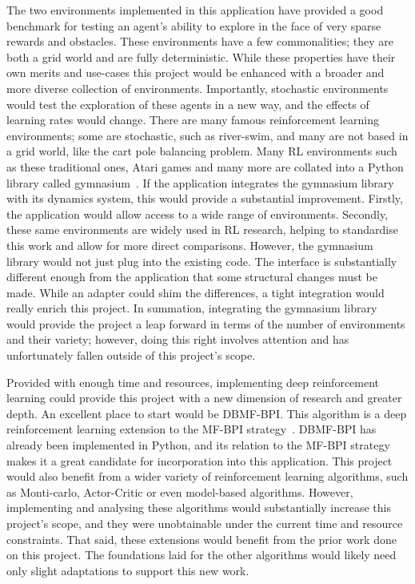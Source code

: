 \documentclass[]{final_report}
\begin{document}
The two environments implemented in this application have provided a good benchmark for testing an agent's ability to explore in the face of very sparse rewards and obstacles. These environments have a few commonalities; they are both a grid world and are fully deterministic. While these properties have their own merits and use-cases this project would be enhanced with a broader and more diverse collection of environments. Importantly, stochastic environments would test the exploration of these agents in a new way, and the effects of learning rates would change. There are many famous reinforcement learning environments; some are stochastic, such as river-swim, and many are not based in a grid world, like the cart pole balancing problem. Many RL environments such as these traditional ones, Atari games and many more are collated into a Python library called gymnasium~\cite{gym}. If the application integrates the gymnasium library with its dynamics system, this would provide a substantial improvement. Firstly, the application would allow access to a wide range of environments. Secondly, these same environments are widely used in RL research, helping to standardise this work and allow for more direct comparisons. However, the gymnasium library would not just plug into the existing code. The interface is substantially different enough from the application that some structural changes must be made. While an adapter could shim the differences, a tight integration would really enrich this project. In summation, integrating the gymnasium library would provide the project a leap forward in terms of the number of environments and their variety; however, doing this right involves attention and has unfortunately fallen outside of this project's scope. 

Provided with enough time and resources, implementing deep reinforcement learning could provide this project with a new dimension of research and greater depth. An excellent place to start would be DBMF-BPI. This algorithm is a deep reinforcement learning extension to the MF-BPI strategy~\cite{modelFree}. DBMF-BPI has already been implemented in Python, and its relation to the MF-BPI strategy makes it a great candidate for incorporation into this application. This project would also benefit from a wider variety of reinforcement learning algorithms, such as Monti-carlo, Actor-Critic or even model-based algorithms. However, implementing and analysing these algorithms would substantially increase this project's scope, and they were unobtainable under the current time and resource constraints. That said, these extensions would benefit from the prior work done on this project. The foundations laid for the other algorithms would likely need only slight adaptations to support this new work. 
\end{document}
